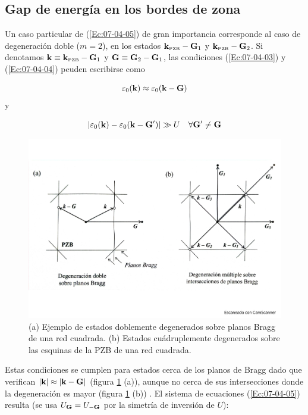 \subsection{Gap de energía en los bordes de zona}


Un caso particular de (\ref{Ec:07-04-05}) de gran importancia corresponde al caso de degeneración doble ($m=2$), en los estados $\mathbf{k}_{\text{{\tiny PZB}}} - \mathbf{G}_1$ y $\mathbf{k}_{\text{{\tiny PZB}}} - \mathbf{G}_2$. Si denotamos $\mathbf{k} \equiv \mathbf{k}_{\text{{\tiny PZB}}} - \mathbf{G}_1$ y $\mathbf{G} \equiv \mathbf{G}_2 - \mathbf{G}_1$, las condiciones (\ref{Ec:07-04-03}) y (\ref{Ec:07-04-04}) peuden escribirse como

\begin{equation}
    \varepsilon_0 (\mathbf{k}) \approx \varepsilon_0 (\mathbf{k} - \mathbf{G})
\end{equation}
y 

\begin{equation}
    |\varepsilon_0 (\mathbf{k}) - \varepsilon_0 (\mathbf{k} - \mathbf{G}')|\gg U \quad \forall \mathbf{G}'\neq \mathbf{G}
\end{equation}

\begin{figure}[h!] \centering
    \includegraphics[scale=0.35]{Cuerpo/Ch_07/Fotos libro 2.pdf}
    \caption{(a) Ejemplo de estados doblemente degenerados sobre planos Bragg de una red cuadrada. (b) Estados cuádruplemente degenerados sobre las esquinas de la PZB de una red cuadrada.}
    \label{Fig:07-02}
\end{figure}    

Estas condiciones se cumplen para estados cerca de los planos de Bragg dado que verifican $|\mathbf{k}|\approx |\mathbf{k}-\mathbf{G}|$ (figura \ref{Fig:07-02} (a)), aunque no cerca de sus intersecciones donde la degeneración es mayor (figura \ref{Fig:07-02} (b)) . El sistema de ecuaciones (\ref{Ec:07-04-05}) resulta (se usa $U_{\mathbf{G}}=U_{-\mathbf{G}}$ por la simetría de inversión de $U$):

